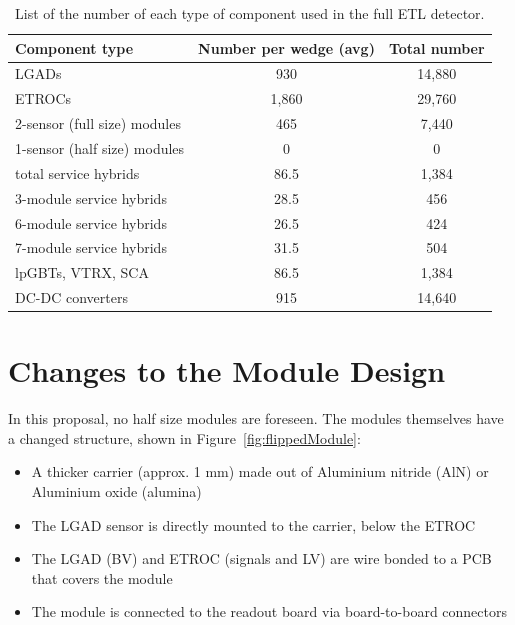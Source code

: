 \documentclass[11pt]{article}
\begin{document}
\begin{table}
  \caption{List of the number of each type of component used in the full ETL detector.}
  \centering
  \begin{tabular}{ l c c }
    Component type               & Number per wedge (avg) & Total number \\
    \midrule
    LGADs                        & 930             & 14,880      \\
    ETROCs                       & 1,860           & 29,760      \\
    2-sensor (full size) modules & 465             & 7,440       \\
    1-sensor (half size) modules & 0               & 0       \\
    total service hybrids     & 86.5               & 1,384       \\
    3-module service hybrids  & 28.5               & 456         \\
    6-module service hybrids  & 26.5               & 424         \\
    7-module service hybrids  & 31.5               & 504         \\
    lpGBTs, VTRX, SCA         & 86.5               & 1,384       \\
    DC-DC converters          & 915                & 14,640        \\ %
  \end{tabular}
  \label{tab:ETLNumberOfComponents}
\end{table}

\section{Changes to the Module Design}

In this proposal, no half size modules are foreseen.
The modules themselves have a changed structure, shown in Figure~\ref{fig:flippedModule}:
\begin{itemize}
  \item A thicker carrier (approx. 1 mm) made out of Aluminium nitride (AlN) or Aluminium oxide (alumina)
  \item The LGAD sensor is directly mounted to the carrier, below the ETROC
  \item The LGAD (BV) and ETROC (signals and LV) are wire bonded to a PCB that covers the module
  \item The module is connected to the readout board via board-to-board connectors
\end{itemize}
\end{document}
